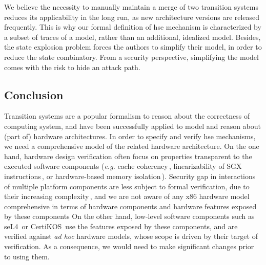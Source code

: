   We believe the necessity to manually maintain a merge of two
transition systems reduces its applicability in the long run, as new
architecture versions are released frequently.
%
This is why our formal definition of \ac{hse} mechanism is characterized by a
subset of traces of a model, rather than an additional, idealized model.
%
Besides, the state explosion problem forces the authors to simplify their model,
in order to reduce the state combinatory.
%
From a security perspective, simplifying the model comes with the risk to hide
an attack path.
%
\subsection{Conclusion}
%
\label{subsec:sota:ltsconclusion}

Transition systems are a popular formalism to reason about the correctness of
computing system, and have been successfully applied to model and reason about
(part of) hardware architectures.
%
In order to specify and verify \ac{hse} mechanisms, we need a comprehensive
model of the related hardware architecture.
%
On the one hand, hardware design verification often focus on properties
transparent to the executed software components (\emph{e.g.} cache
coherency\,\cite{stern1995cachecoherence}, linearizability of SGX
instructions\,\cite{leslie2015linsgx}, or hardware-based memory
isolation\,\cite{lie2003xom}).
%
Security gap in interactions 
of multiple platform components are less subject to formal verification, due to
their increasing complexity\,\cite{potlapally2011hardwaresecurity}, and we are
not aware of any x86 hardware model comprehensive in terms of hardware
components and hardware features exposed by these components
%
On the other hand, low-level software components such as
seL4\,\cite{klein2009sel4} or CertiKOS\,\cite{gu2016certikos} use the features
exposed by these components, and are verified against \emph{ad hoc} hardware
models, whose scope is driven by their target of verification.
%
As a consequence, we would need to make significant changes prior to using them.

